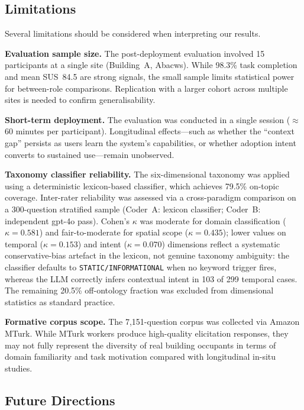 \documentclass[acmsmall]{acmart}
\begin{document}
\subsection{Limitations}
\label{sec:limitations}

Several limitations should be considered when interpreting our results.

\textbf{Evaluation sample size.} The post-deployment evaluation involved 15 participants at a single site (Building~A, Abacws). While 98.3\% task completion and mean SUS~84.5 are strong signals, the small sample limits statistical power for between-role comparisons. Replication with a larger cohort across multiple sites is needed to confirm generalisability.

\textbf{Short-term deployment.} The evaluation was conducted in a single session ($\approx$60 minutes per participant). Longitudinal effects---such as whether the ``context gap'' persists as users learn the system's capabilities, or whether adoption intent converts to sustained use---remain unobserved.

\textbf{Taxonomy classifier reliability.} The six-dimensional taxonomy was applied using a deterministic lexicon-based classifier, which achieves 79.5\% on-topic coverage. Inter-rater reliability was assessed via a cross-paradigm comparison on a 300-question stratified sample (Coder~A: lexicon classifier; Coder~B: independent gpt-4o pass). Cohen's $\kappa$ was moderate for domain classification ($\kappa=0.581$) and fair-to-moderate for spatial scope ($\kappa=0.435$); lower values on temporal ($\kappa=0.153$) and intent ($\kappa=0.070$) dimensions reflect a systematic conservative-bias artefact in the lexicon, not genuine taxonomy ambiguity: the classifier defaults to \texttt{STATIC/INFORMATIONAL} when no keyword trigger fires, whereas the LLM correctly infers contextual intent in 103 of 299 temporal cases. The remaining 20.5\% off-ontology fraction was excluded from dimensional statistics as standard practice.

\textbf{Formative corpus scope.} The 7{,}151-question corpus was collected via Amazon MTurk. While MTurk workers produce high-quality elicitation responses, they may not fully represent the diversity of real building occupants in terms of domain familiarity and task motivation compared with longitudinal in-situ studies.

\subsection{Future Directions}
\end{document}
